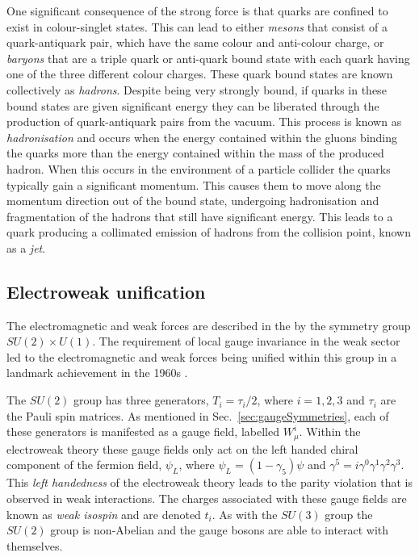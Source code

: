One significant consequence of the strong force is that quarks are
confined to exist in colour-singlet states. This can lead to either
\emph{mesons} that consist of a quark-antiquark pair, which have the
same colour and anti-colour charge, or \emph{baryons} that are a
triple quark or anti-quark bound state with each quark having one of
the three different colour charges. These quark bound states are known
collectively as \emph{hadrons}. Despite being very strongly bound, if
quarks in these bound states are given significant energy they can be
liberated through the production of quark-antiquark pairs from the
vacuum. This process is known as \emph{hadronisation} and occurs when
the energy contained within the gluons binding the quarks more than
the energy contained within the mass of the produced hadron. When this
occurs in the environment of a particle collider the quarks typically
gain a significant momentum. This causes them to move along the
momentum direction out of the bound state, undergoing hadronisation
and fragmentation of the hadrons that still have significant energy.
This leads to a quark producing a collimated emission of hadrons from
the collision point, known as a \emph{jet}.

\subsection{Electroweak unification}

The electromagnetic and weak forces are described in the \SM by the
symmetry group $SU(2)\times U(1)$. The requirement of local gauge
invariance in the weak sector led to the electromagnetic and weak
forces being unified within this group in a landmark achievement in
the 1960s \cite{Glashow:1961tr,PhysRevLett.19.1264,Salam:1964ry}.

The $SU(2)$ group has three generators, $T_i=\tau_i/2$, where
$i=1,2,3$ and $\tau_i$ are the Pauli spin matrices. As mentioned in
Sec.~\ref{sec:gaugeSymmetries}, each of these generators is manifested
as a gauge field, labelled $W_{\mu}^i$. Within the electroweak theory
these gauge fields only act on the left handed chiral component of the
fermion field, $\psi_L$, where $\psi_L = (1-\gamma_5)\psi$ and
$\gamma^5=i\gamma^0\gamma^1\gamma^2\gamma^3$. This \emph{left
handedness} of the electroweak theory leads to the parity violation
that is observed in weak interactions. The charges associated with
these gauge fields are known as \emph{weak isospin} and are denoted
$t_i$. As with the $SU(3)$ group the $SU(2)$ group is non-Abelian and
the gauge bosons are able to interact with themselves.

